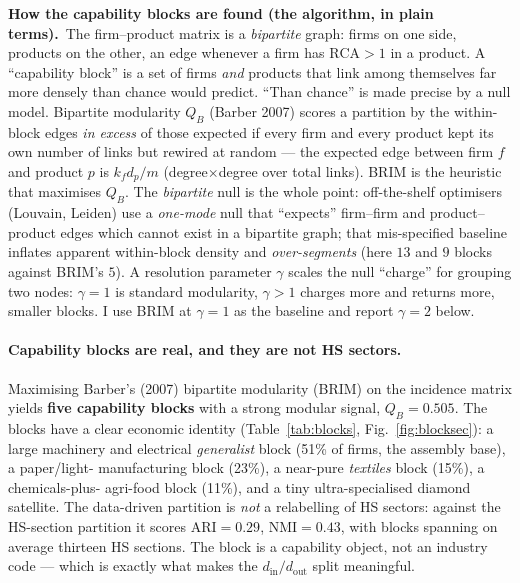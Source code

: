 \documentclass[11pt]{article}
\newcommand{\din}{d_{\mathrm{in}}}
\newcommand{\dout}{d_{\mathrm{out}}}
\newcommand{\RCA}{\mathrm{RCA}}
\newcommand{\QB}{Q_B}
\begin{document}
\begin{keybox}
\textbf{How the capability blocks are found (the algorithm, in plain terms).}\ The
firm--product matrix is a \emph{bipartite} graph: firms on one side, products on the
other, an edge whenever a firm has $\RCA>1$ in a product. A ``capability block'' is a
set of firms \emph{and} products that link among themselves far more densely than chance
would predict. ``Than chance'' is made precise by a null model. Bipartite modularity
$\QB$ (Barber 2007) scores a partition by the within-block edges \emph{in excess} of those
expected if every firm and every product kept its own number of links but rewired at
random --- the expected edge between firm $f$ and product $p$ is $k_f d_p/m$
(degree$\times$degree over total links). BRIM is the heuristic that maximises $\QB$. The
\emph{bipartite} null is the whole point: off-the-shelf optimisers (Louvain, Leiden) use
a \emph{one-mode} null that ``expects'' firm--firm and product--product edges which cannot
exist in a bipartite graph; that mis-specified baseline inflates apparent within-block
density and \emph{over-segments} (here $13$ and $9$ blocks against BRIM's $5$). A
resolution parameter $\gamma$ scales the null ``charge'' for grouping two nodes: $\gamma=1$
is standard modularity, $\gamma>1$ charges more and returns more, smaller blocks. I use
BRIM at $\gamma=1$ as the baseline and report $\gamma=2$ below.
\end{keybox}

\paragraph{Capability blocks are real, and they are not HS sectors.} Maximising Barber's
(2007) bipartite modularity (BRIM) on the incidence matrix yields \textbf{five capability
blocks} with a strong modular signal, $\QB=0.505$. The blocks have a clear economic
identity (Table~\ref{tab:blocks}, Fig.~\ref{fig:blocksec}): a large machinery and
electrical \emph{generalist} block (51\% of firms, the assembly base), a paper/light-%
manufacturing block (23\%), a near-pure \emph{textiles} block (15\%), a chemicals-plus-%
agri-food block (11\%), and a tiny ultra-specialised diamond satellite. The data-driven
partition is \emph{not} a relabelling of HS sectors: against the HS-section
partition it scores $\mathrm{ARI}=0.29$, $\mathrm{NMI}=0.43$, with blocks spanning on
average thirteen HS sections. The block is a capability object, not an industry code ---
which is exactly what makes the $\din/\dout$ split meaningful.
\end{document}
